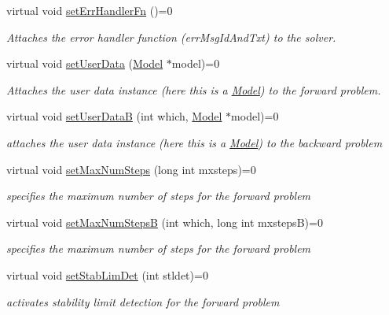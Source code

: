 \begin{DoxyCompactItemize}
virtual void \mbox{\hyperlink{classamici_1_1_solver_ab5e90e0ad8f195cd6ca2ce477cc734b7}{set\+Err\+Handler\+Fn}} ()=0
\begin{DoxyCompactList}\small\item\em Attaches the error handler function (err\+Msg\+Id\+And\+Txt) to the solver. \end{DoxyCompactList}\item 
virtual void \mbox{\hyperlink{classamici_1_1_solver_ac1ca4675503688acf946f6530fb12c10}{set\+User\+Data}} (\mbox{\hyperlink{classamici_1_1_model}{Model}} $\ast$model)=0
\begin{DoxyCompactList}\small\item\em Attaches the user data instance (here this is a \mbox{\hyperlink{classamici_1_1_model}{Model}}) to the forward problem. \end{DoxyCompactList}\item 
virtual void \mbox{\hyperlink{classamici_1_1_solver_ac5c347a985fa73861a88e76c7b9904f8}{set\+User\+DataB}} (int which, \mbox{\hyperlink{classamici_1_1_model}{Model}} $\ast$model)=0
\begin{DoxyCompactList}\small\item\em attaches the user data instance (here this is a \mbox{\hyperlink{classamici_1_1_model}{Model}}) to the backward problem \end{DoxyCompactList}\item 
virtual void \mbox{\hyperlink{classamici_1_1_solver_a29f208ce304b01c8fe294ab9143a98e5}{set\+Max\+Num\+Steps}} (long int mxsteps)=0
\begin{DoxyCompactList}\small\item\em specifies the maximum number of steps for the forward problem \end{DoxyCompactList}\item 
virtual void \mbox{\hyperlink{classamici_1_1_solver_a1163fddb222195354bdcf306fc52a1d0}{set\+Max\+Num\+StepsB}} (int which, long int mxstepsB)=0
\begin{DoxyCompactList}\small\item\em specifies the maximum number of steps for the forward problem \end{DoxyCompactList}\item 
virtual void \mbox{\hyperlink{classamici_1_1_solver_a040fb365c47a8e8ccc1f32021b38bfcb}{set\+Stab\+Lim\+Det}} (int stldet)=0
\begin{DoxyCompactList}\small\item\em activates stability limit detection for the forward problem \end{DoxyCompactList}\item 

\end{DoxyCompactItemize}
